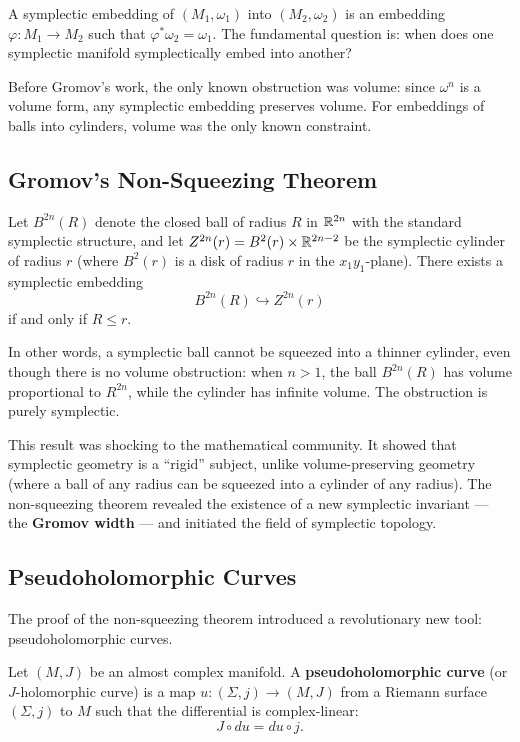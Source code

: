 A symplectic embedding of \((M_1, \omega_1)\) into \((M_2, \omega_2)\) is an embedding \(\varphi: M_1 \to M_2\) such that \(\varphi^*\omega_2 = \omega_1\). The fundamental question is: when does one symplectic manifold symplectically embed into another?

Before Gromov's work, the only known obstruction was volume: since \(\omega^n\) is a volume form, any symplectic embedding preserves volume. For embeddings of balls into cylinders, volume was the only known constraint.

\subsection{Gromov's Non-Squeezing Theorem}

\begin{theorem}
Let \(B^{2n}(R)\) denote the closed ball of radius \(R\) in \(\mathbb{R}^{2n}\) with the standard symplectic structure, and let \(Z^{2n}(r) = B^2(r) \times \mathbb{R}^{2n-2}\) be the symplectic cylinder of radius \(r\) (where \(B^2(r)\) is a disk of radius \(r\) in the \(x_1y_1\)-plane). There exists a symplectic embedding
\[
B^{2n}(R) \hookrightarrow Z^{2n}(r)
\]
if and only if \(R \leq r\).
\end{theorem}

In other words, a symplectic ball cannot be squeezed into a thinner cylinder, even though there is no volume obstruction: when \(n > 1\), the ball \(B^{2n}(R)\) has volume proportional to \(R^{2n}\), while the cylinder has infinite volume. The obstruction is purely symplectic.

This result was shocking to the mathematical community. It showed that symplectic geometry is a ``rigid'' subject, unlike volume-preserving geometry (where a ball of any radius can be squeezed into a cylinder of any radius). The non-squeezing theorem revealed the existence of a new symplectic invariant --- the \textbf{Gromov width} --- and initiated the field of symplectic topology.

\subsection{Pseudoholomorphic Curves}

The proof of the non-squeezing theorem introduced a revolutionary new tool: pseudoholomorphic curves.

\begin{definition}
Let \((M, J)\) be an almost complex manifold. A \textbf{pseudoholomorphic curve} (or \(J\)-holomorphic curve) is a map \(u: (\Sigma, j) \to (M, J)\) from a Riemann surface \((\Sigma, j)\) to \(M\) such that the differential is complex-linear:
\[
J \circ du = du \circ j.
\]
\end{definition}

